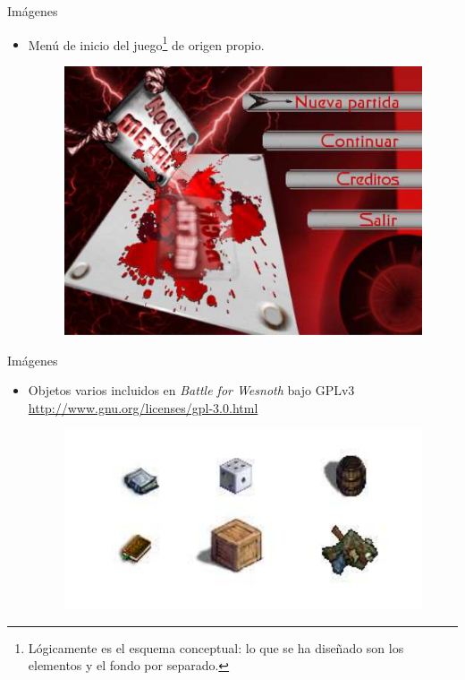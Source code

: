 \documentclass[9pt,xcolor=svgnames]{beamer}
\begin{document}
  
  \begin{frame}{Imágenes}
   
   \begin{itemize}
    \item Menú de inicio del juego\footnote{Lógicamente es el esquema
	  conceptual: lo que se ha diseñado son los elementos y el fondo
	  por separado.} de origen propio.
	  
	  \begin{figure}[t]
	   \includegraphics[scale=0.15]{./Imagenes/menu.pdf}
	  \end{figure}
   \end{itemize}
   
  \end{frame}
  
  
  
  \begin{frame}{Imágenes}
   
   \begin{itemize}
    \item Objetos varios incluidos en \textit{Battle for Wesnoth} bajo
	  GPLv3\\
	  \url{http://www.gnu.org/licenses/gpl-3.0.html}
	  
	  \begin{figure}[t]
	   \includegraphics[scale=0.5]{./Imagenes/objetos.pdf}
	  \end{figure}
	  
   \end{itemize}
   
  \end{frame}
  
\end{document}
